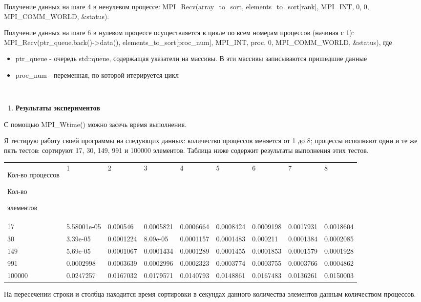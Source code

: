 \documentclass[]{article}
\begin{document}
Получение данных на шаге 4 в ненулевом процессе:
MPI\_Recv(array\_to\_sort, elements\_to\_sort{[}rank{]}, MPI\_INT, 0, 0,
MPI\_COMM\_WORLD, \&status).

Получение данных на шаге 6 в нулевом процессе осуществляется в цикле по
всем номерам процессов (начиная с 1):
MPI\_Recv(ptr\_queue.back()-\textgreater{}data(),
elements\_to\_sort{[}proc\_num{]}, MPI\_INT, proc, 0, MPI\_COMM\_WORLD,
\&status), где

\begin{itemize}
\item
  ptr\_queue - очередь std::queue, содержащая указатели на массивы. В
  эти массивы записываются пришедшие данные
\item
  proc\_num - переменная, по которой итерируется цикл
\end{itemize}

\textbf{\\
}

\begin{enumerate}
\def\labelenumi{\arabic{enumi}.}
\setcounter{enumi}{1}
\item
  \textbf{Результаты экспериментов}
\end{enumerate}

С помощью MPI\_Wtime() можно засечь время выполнения.

Я тестирую работу своей программы на следующих данных: количество
процессов меняется от 1 до 8; процессы исполняют одни и те же пять
тестов: сортируют 17, 30, 149, 991 и 100000 элементов. Таблица ниже
содержит результаты выполнения этих тестов.

\begin{longtable}[]{@{}lllllllll@{}}
\toprule
Кол-во процессов

Кол-во

элементов & 1 & 2 & 3 & 4 & 5 & 6 & 7 & 8\tabularnewline
17 & 5.58001e-05 & 0.000546 & 0.0005821 & 0.0006664 & 0.0008424 &
0.0009198 & 0.0017931 & 0.0018604\tabularnewline
30 & 3.39e-05 & 0.0001224 & 8.09e-05 & 0.0001157 & 0.0001483 & 0.000211
& 0.0001384 & 0.0002085\tabularnewline
149 & 5.69e-05 & 0.0001067 & 0.0001434 & 0.0001289 & 0.0001455 &
0.0001853 & 0.0001579 & 0.0001928\tabularnewline
991 & 0.0002998 & 0.0003639 & 0.0002996 & 0.0002323 & 0.0003774 &
0.0003755 & 0.0003766 & 0.0004862\tabularnewline
100000 & 0.0247257 & 0.0167032 & 0.0179571 & 0.0140793 & 0.0148861 &
0.0167483 & 0.0136261 & 0.0150003\tabularnewline
\bottomrule
\end{longtable}

На пересечении строки и столбца находится время сортировки в секундах
данного количества элементов данным количеством процессов.
\end{document}
